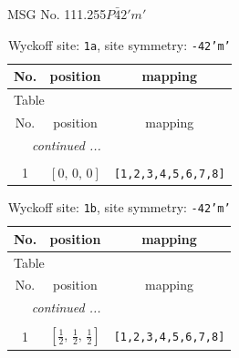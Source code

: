 \documentclass[fleqn,8pt]{jsarticle}
\begin{document}
\setcounter{MaxMatrixCols}{32}

\renewcommand{\tablename}{Table~}
\renewcommand{\figurename}{Figure~}
\begin{center}
\LARGE
MSG No. 111.255\quad$P\bar{4}2'm'$
\end{center}
\renewcommand{\arraystretch}{1.2}
\begin{longtable}{ccc}
\caption{Wyckoff site: {\tt 1a}, site symmetry: {\tt -42'm'}}
 \\
 \hline \hline
No. & position & mapping \\ \hline \endfirsthead

\multicolumn{2}{l}{\tablename\ \thetable{}} \\
 \hline \hline
No. & position & mapping \\ \hline \endhead

 \hline \hline
\multicolumn{2}{r}{\footnotesize\it continued ...} \\ \endfoot

 \hline \hline
\multicolumn{2}{r}{} \\ \endlastfoot

1 & $\left[ 0,\, 0,\, 0 \right]$ & {\tt [1,2,3,4,5,6,7,8]} \\
\end{longtable}
\renewcommand{\arraystretch}{1.2}
\begin{longtable}{ccc}
\caption{Wyckoff site: {\tt 1b}, site symmetry: {\tt -42'm'}}
 \\
 \hline \hline
No. & position & mapping \\ \hline \endfirsthead

\multicolumn{2}{l}{\tablename\ \thetable{}} \\
 \hline \hline
No. & position & mapping \\ \hline \endhead

 \hline \hline
\multicolumn{2}{r}{\footnotesize\it continued ...} \\ \endfoot

 \hline \hline
\multicolumn{2}{r}{} \\ \endlastfoot

1 & $\left[ \frac{1}{2},\, \frac{1}{2},\, \frac{1}{2} \right]$ & {\tt [1,2,3,4,5,6,7,8]} \\
\end{longtable}
\renewcommand{\arraystretch}{1.2}
\end{document}
